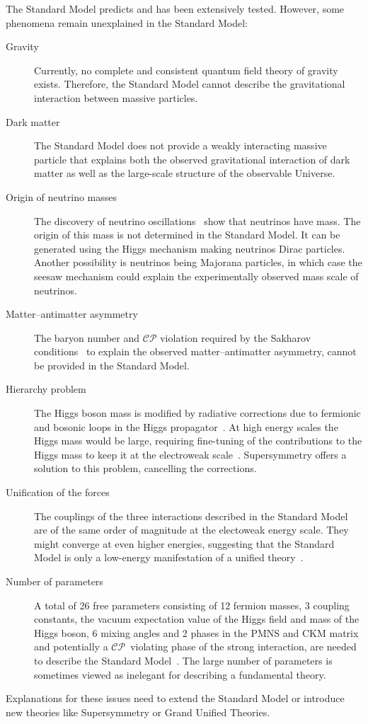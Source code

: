The Standard Model predicts and has been extensively tested. However, some
phenomena remain unexplained in the Standard Model:
\begin{description}
\item[Gravity] Currently, no complete and consistent quantum field theory of
  gravity exists. Therefore, the Standard Model cannot describe the
  gravitational interaction between massive particles.

\item[Dark matter] The Standard Model does not provide a weakly interacting
  massive particle that explains both the observed gravitational interaction of
  dark matter as well as the large-scale structure of the observable Universe.

\item[Origin of neutrino masses] The discovery of neutrino
  oscillations~\cite{superk_neutrino, sno_neutrino_1, sno_neutrino_2} show that
  neutrinos have mass. The origin of this mass is not determined in the Standard
  Model. It can be generated using the Higgs mechanism making neutrinos Dirac
  particles. Another possibility is neutrinos being Majorana particles, in which
  case the seesaw mechanism could explain the experimentally observed mass scale
  of neutrinos.

\item[Matter--antimatter asymmetry] The baryon number and $\mathcal{CP}$
  violation required by the Sakharov conditions~\cite{sakharov} to explain the
  observed matter--antimatter asymmetry, cannot be provided in the Standard
  Model.

\item[Hierarchy problem] The Higgs boson mass is modified by radiative
  corrections due to fermionic and bosonic loops in the Higgs
  propagator~\cite{bettini}. At high energy scales the Higgs mass would be
  large, requiring fine-tuning of the contributions to the Higgs mass to keep it
  at the electroweak scale~\cite{thomson}. Supersymmetry offers a solution to
  this problem, cancelling the corrections.

\item[Unification of the forces] The couplings of the three interactions
  described in the Standard Model are of the same order of magnitude at the
  electoweak energy scale. They might converge at even higher energies,
  suggesting that the Standard Model is only a low-energy manifestation of a
  unified theory~\cite{thomson}.

\item[Number of parameters] A total of 26 free parameters consisting of 12
  fermion masses, 3 coupling constants, the vacuum expectation value of the
  Higgs field and mass of the Higgs boson, 6 mixing angles and 2 phases in the
  PMNS and CKM matrix and potentially a $\mathcal{CP}$~violating phase of the
  strong interaction, are needed to describe the Standard Model~\cite{thomson}.
  The large number of parameters is sometimes viewed as inelegant for describing
  a fundamental theory.
\end{description}
Explanations for these issues need to extend the Standard Model or introduce new
theories like Supersymmetry or Grand Unified Theories.

